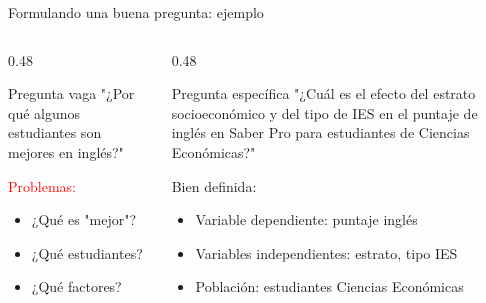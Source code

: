 \documentclass[aspectratio=169, 11pt]{beamer}
\begin{document}
\begin{frame}{Formulando una buena pregunta: ejemplo}
\begin{columns}
\begin{column}{0.48\textwidth}
\begin{alertblock}{Pregunta vaga}
"¿Por qué algunos estudiantes son mejores en inglés?"

\vspace{0.1cm}
\small
\textcolor{red}{Problemas:}
\begin{itemize}\setlength{\itemsep}{0pt}
\item ¿Qué es "mejor"?
\item ¿Qué estudiantes?
\item ¿Qué factores?
\end{itemize}
\end{alertblock}
\end{column}

\begin{column}{0.48\textwidth}
\begin{exampleblock}{Pregunta específica}
"¿Cuál es el efecto del estrato socioeconómico y del tipo de IES en el puntaje de inglés en Saber Pro para estudiantes de Ciencias Econ\'omicas?"

\vspace{0.1cm}
\small
\textcolor{javerianalight}{Bien definida:}
\begin{itemize}\setlength{\itemsep}{0pt}
\item Variable dependiente: puntaje inglés
\item Variables independientes: estrato, tipo IES
\item Población: estudiantes Ciencias Econ\'omicas
\end{itemize}
\end{exampleblock}
\end{column}
\end{columns}
\end{frame}
\end{document}
